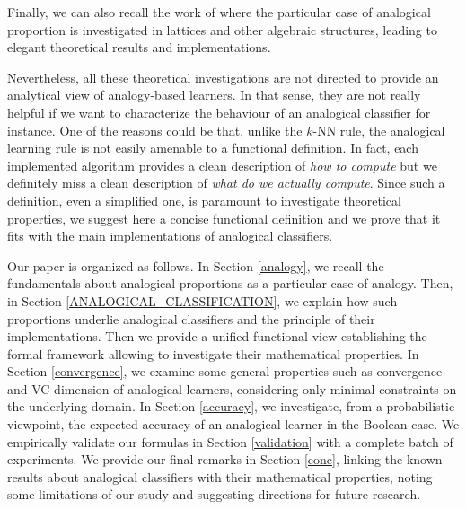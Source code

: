 \documentclass{ecai}
\begin{document}
Finally, we can also recall the work of \cite{BarbMicIrisa2009} where the
particular case of analogical proportion is investigated in lattices and other
algebraic structures, leading to elegant theoretical results and implementations.

Nevertheless, all these theoretical investigations are not directed to provide
an analytical view of analogy-based learners. In that sense, they are not
really helpful if we want to characterize the behaviour of an analogical
classifier for instance. One of the reasons could be that, unlike the $k$-NN
rule, the analogical learning rule is not easily amenable to a functional
definition. In fact, each implemented algorithm  provides a clean description
of {\it how to compute} but we definitely miss a clean description of {\it what
do we actually compute}.
Since such a definition, even a simplified one, is paramount to investigate
theoretical properties, we suggest here a concise functional definition and we
prove that it fits with the main implementations of analogical classifiers.




Our paper is organized as follows. In Section \ref{analogy}, we recall the
fundamentals about analogical proportions as a particular case of analogy.
Then, in Section \ref{ANALOGICAL_CLASSIFICATION}, we explain how such
proportions underlie analogical classifiers and the principle of their
implementations.  Then we provide a unified functional view establishing the
formal framework allowing to investigate their mathematical properties.  In
Section \ref{convergence}, we examine some general properties such as
convergence and VC-dimension of analogical learners, considering only minimal
constraints on the underlying domain.  In Section \ref{accuracy}, we
investigate, from a probabilistic viewpoint, the expected accuracy of an
analogical learner in the Boolean case. We empirically validate our formulas in
Section \ref{validation} with a complete batch of experiments.
We provide our final remarks in Section \ref{conc}, linking the known results
about analogical classifiers with their mathematical properties, noting some
limitations of our study and suggesting directions for future research.
\end{document}
